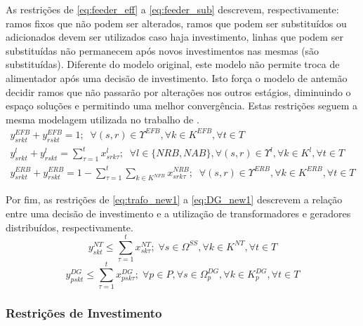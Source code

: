 As restrições de \eqref{eq:feeder_eff} a \eqref{eq:feeder_sub} descrevem, respectivamente: ramos fixos que não podem ser alterados, ramos que podem ser substituídos ou adicionados devem ser utilizados caso haja investimento, linhas que podem ser substituídas não permanecem após novos investimentos nas mesmas (são substituídas). Diferente do modelo original, este modelo não permite troca de alimentador após uma decisão de investimento. Isto força o modelo de antemão decidir ramos que não passarão por alterações nos outros estágios, diminuindo o espaço soluções e permitindo uma melhor convergência. Estas restrições seguem a mesma modelagem utilizada no trabalho de .
\begin{align}%
    y^{EFB}_{srkt} + y^{EFB}_{rskt} =  1; \; \; \forall (s,r) \in \Upsilon^{EFB},  \forall k \in K^{EFB}, \forall t \in T
    \label{eq:feeder_eff}\\
    y^{l}_{srkt} + y^{l}_{rskt} = \sum_{\tau = 1}^{t} x^l_{srk\tau}; \; \; \forall l \in \{NRB, NAB\}, \forall (s,r) \in \Upsilon^{l},  \forall k \in K^{l}, \forall t \in T
    \label{eq:feeder_new}\\
    y^{ERB}_{srkt} + y^{ERB}_{rskt} =  1 - \sum_{\tau = 1}^{t}\sum_{k \in K^{NFB}} x^{NRB}_{srk\tau}; \; \; \forall (s,r) \in \Upsilon^{ERB},  \forall k \in K^{ERB}, \forall t \in T
    \label{eq:feeder_sub}
\end{align}

Por fim, as restrições de \eqref{eq:trafo_new1} a \eqref{eq:DG_new1} descrevem a relação entre uma decisão de investimento e a utilização de transformadores e geradores distribuídos, respectivamente.
\begin{equation}
    y^{NT}_{skt} \leq \sum_{\tau = 1}^{t} x^{NT}_{sk\tau}; \; \forall s \in \Omega^{SS}, \forall k \in K^{NT}, \forall t \in T
    \label{eq:trafo_new1}
\end{equation}
\begin{equation}
    y^{DG}_{pskt} \leq \sum_{\tau = 1}^{t} x^{DG}_{psk\tau}; \; \forall p \in P,  \forall s \in \Omega^{DG}_p, \forall k \in K^{DG}_p, \forall t \in T
    \label{eq:DG_new1}
\end{equation}

\subsubsection*{Restrições de Investimento}

